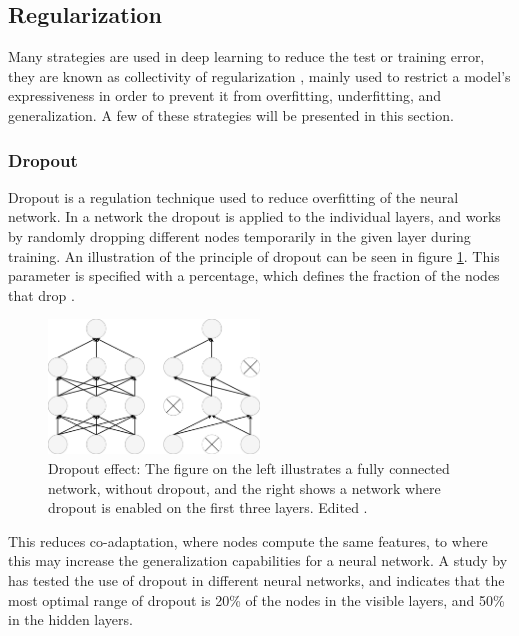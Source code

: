 

\subsection{Regularization}
Many strategies are used in deep learning to reduce the test or training error, they are known as collectivity of regularization \citep{Goodfellow2016}, mainly used to restrict a model's expressiveness in order to prevent it from overfitting, underfitting, and generalization. A few of these strategies will be presented in this section.

\subsubsection{Dropout}\label{sec:dropout}
Dropout is a regulation technique used to reduce overfitting of the neural network. In a network the dropout is applied to the individual layers, and works by randomly dropping different nodes temporarily in the given layer during training. An illustration of the principle of dropout can be seen in figure \ref{fig:Dropout}. This parameter is specified with a percentage, which defines the fraction of the nodes that drop \citep{Chollet2015}.

\begin{figure} [H]
\centering
\includegraphics[width=0.5\textwidth]{figures/Dropout}
\caption{Dropout effect: The figure on the left illustrates a fully connected network, without dropout, and the right shows a network where dropout is enabled on the first three layers. Edited \citep{Srivastava2014}.}
\label{fig:Dropout} 
\end{figure}

\noindent
This reduces co-adaptation, where nodes compute the same features, to where this may increase the generalization capabilities for a neural network. 
A study by \citeauthor{Srivastava2014} \citep{Srivastava2014} has tested the use of dropout in different neural networks, and indicates that the most optimal range of dropout is 20\% of the nodes in the visible layers, and 50\% in the hidden layers.\citep{Srivastava2014}

